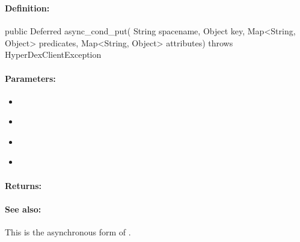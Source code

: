 \pagebreak
\subsubsection{}
\label{api:java:async_cond_put}


\paragraph{Definition:}
\begin{javacode}
public Deferred async_cond_put(
        String spacename,
        Object key,
        Map<String, Object> predicates,
        Map<String, Object> attributes) throws HyperDexClientException
\end{javacode}

\paragraph{Parameters:}
\begin{itemize}[noitemsep]
\item {}\\

\item {}\\

\item {}\\

\item {}\\

\end{itemize}

\paragraph{Returns:}


\paragraph{See also:}  This is the asynchronous form of .

\pagebreak
\subsubsection{}
\label{api:java:put_if_not_exist}


